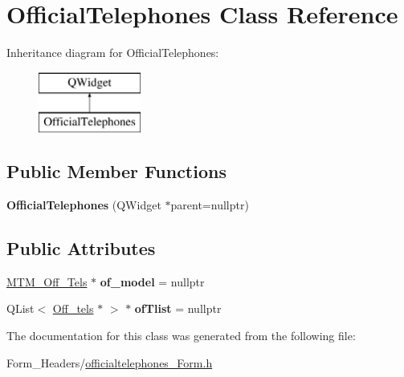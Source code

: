\hypertarget{class_official_telephones}{}\section{Official\+Telephones Class Reference}
\label{class_official_telephones}
Inheritance diagram for Official\+Telephones\+:\begin{figure}[H]
\begin{center}
\leavevmode
\includegraphics[height=2.000000cm]{class_official_telephones}
\end{center}
\end{figure}
\subsection*{Public Member Functions}
\begin{DoxyCompactItemize}
\item 
\mbox{\label{class_official_telephones_ac2f388018885bd82131cbc208264bc4f}} 
{\bfseries Official\+Telephones} (Q\+Widget $\ast$parent=nullptr)
\end{DoxyCompactItemize}
\subsection*{Public Attributes}
\begin{DoxyCompactItemize}
\item 
\mbox{\label{class_official_telephones_a9bbb0da0147b19065b8e5a5ba2629568}} 
\mbox{\hyperlink{class_m_t_m___off___tels}{M\+T\+M\+\_\+\+Off\+\_\+\+Tels}} $\ast$ {\bfseries of\+\_\+model} = nullptr
\item 
\mbox{\label{class_official_telephones_ab7e23a80be9e3e57a20556b0a657f244}} 
Q\+List$<$ \mbox{\hyperlink{class_off__tels}{Off\+\_\+tels}} $\ast$ $>$ $\ast$ {\bfseries of\+Tlist} = nullptr
\end{DoxyCompactItemize}


The documentation for this class was generated from the following file\+:\begin{DoxyCompactItemize}
\item 
Form\+\_\+\+Headers/\mbox{\hyperlink{officialtelephones___form_8h}{officialtelephones\+\_\+\+Form.\+h}}\end{DoxyCompactItemize}
